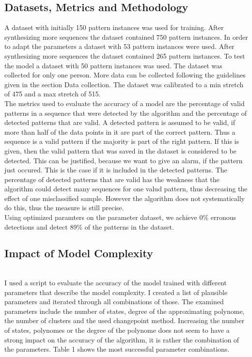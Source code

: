 \documentclass{article}
\begin{document}
\subsection{Datasets, Metrics and Methodology}
A dataset with initially 150 pattern instances was used for training. After synthesizing more sequences the dataset contained 750 pattern instances. In order to adapt the parameters a dataset with 53  pattern instances were used.  After synthesizing more sequences the dataset contained 265 pattern instances. To test the model a dataset with 50 pattern instances was used.  The dataset was collected for only one person. More data can be collected following the guidelines given in the section Data collection. The dataset was calibrated to a min stretch of 475 and a max stretch of 515.\\
The metrics used to evaluate the accuracy of a model are the percentage of valid patterns in a sequence that were detected by the algorithm and the percentage of detected patterns that are valid. A detected pattern is assumed to be valid, if more than half of the data points in it are part of the correct pattern. Thus a sequence is a valid pattern if the majority is part of the right pattern. If this is given, then the valid pattern that was saved in the dataset is considered to be detected. This can be justified, because we want to give an alarm, if the pattern just occured. This is the case if it is included in the detected patterns. The percentage of detected patterns that are valid has the weakness that the algorithm could detect many sequences for one valud pattern, thus decreasing the effect of one misclassified sample. However the algorithm does not systematically do this, thus the measure is still precise.\\
Using optimized paramters on the parameter dataset, we achieve 0\% erronous detections and detect 89\% of the patterns in the dataset. \\
\subsection{Impact of Model Complexity} \\ 
I used a script to evaluate the accuracy of the model trained with different parameters that describe the model complexity. I created a list of plausible parameters and iterated through all combinations of those. The examined parameters include the number of states, degree of the approximating polynome, the number of clusters and the used changepoint method. Increasing the number of states, polynomes or the degree of the polynome does not seem to have a strong impact on the accuracy of the algorithm, it is rather the combination of the parameters. Table 1 shows the most successful parameter combinations.
\end{document}
